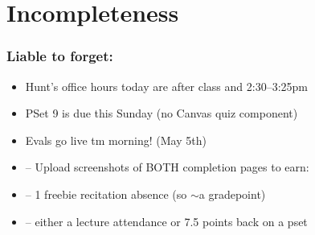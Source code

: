 ﻿%





\setcounter{section}{9} 

\section{Incompleteness}

\begin{frame}

\scriptsize{\tableofcontents}

\end{frame}



\begin{frame}
\frametitle{Liable to forget:}

\begin{itemize}[<+->]

\item Hunt's office hours today are after class and 2:30--3:25pm

\item PSet 9 is due this Sunday (no Canvas quiz component)

\item Evals go live tm morning! (May 5th)

\item[] -- Upload screenshots of BOTH completion pages to earn: %

\item[] -- 1 freebie recitation absence (so $\sim$a gradepoint)

\item[] -- either a lecture attendance or 7.5 points back on a pset



\end{itemize}
\end{frame}

